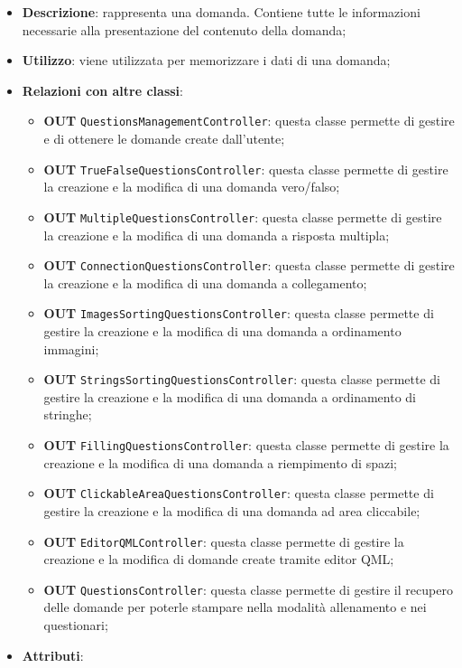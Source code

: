 		\begin{itemize}
			\item \textbf{Descrizione}: rappresenta una domanda. Contiene tutte le informazioni necessarie alla presentazione del contenuto della domanda;
			\item \textbf{Utilizzo}: viene utilizzata per memorizzare i dati di una domanda;
			\item \textbf{Relazioni con altre classi}: 
			\begin{itemize}
				\item \textbf{OUT} \texttt{QuestionsManagementController}: questa classe permette di gestire e di ottenere le domande create dall'utente;
				\item \textbf{OUT} \texttt{TrueFalseQuestionsController}: questa classe permette di gestire la creazione e la modifica di una domanda vero/falso;
				\item \textbf{OUT} \texttt{MultipleQuestionsController}: questa classe permette di gestire la creazione e la modifica di una domanda a risposta multipla; 
				\item \textbf{OUT} \texttt{ConnectionQuestionsController}: questa classe permette di gestire la creazione e la modifica di una domanda a collegamento;
				\item \textbf{OUT} \texttt{ImagesSortingQuestionsController}: questa classe permette di gestire la creazione e la modifica di una domanda a ordinamento immagini;
				\item \textbf{OUT} \texttt{StringsSortingQuestionsController}: questa classe permette di gestire la creazione e la modifica di una domanda a ordinamento di stringhe;
				\item \textbf{OUT} \texttt{FillingQuestionsController}: questa classe permette di gestire la creazione e la modifica di una domanda a riempimento di spazi; 
				\item \textbf{OUT} \texttt{ClickableAreaQuestionsController}: questa classe permette di gestire la creazione e la modifica di una domanda ad area cliccabile;
				\item \textbf{OUT} \texttt{EditorQMLController}: questa classe permette di gestire la creazione e la modifica di domande create tramite editor QML;
				\item \textbf{OUT} \texttt{QuestionsController}: questa classe permette di gestire il recupero delle domande per poterle stampare nella modalità allenamento e nei questionari;
			\end{itemize}
			\item \textbf{Attributi}: 

\end{itemize}

